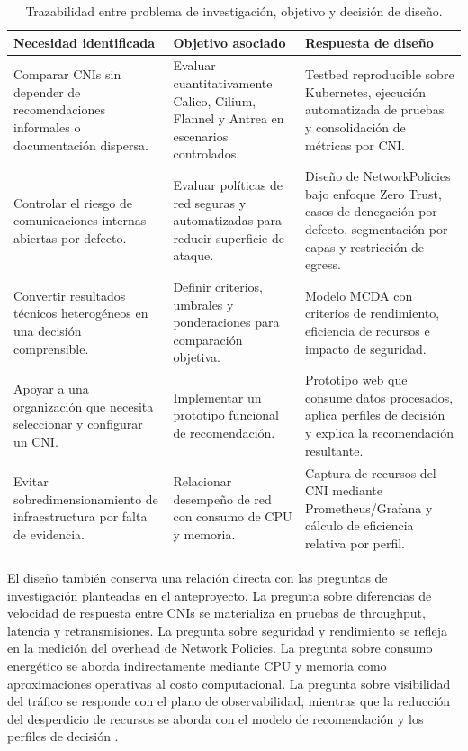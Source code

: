 \begin{table}[htbp]
\centering
\scriptsize
\caption{Trazabilidad entre problema de investigación, objetivo y decisión de diseño.}
\label{tab:trazabilidad-diseno}
\begin{tabularx}{\textwidth}{|Y|Y|Y|}
\hline
\textbf{Necesidad identificada} & \textbf{Objetivo asociado} & \textbf{Respuesta de diseño} \\
\hline
Comparar CNIs sin depender de recomendaciones informales o documentación dispersa. & Evaluar cuantitativamente Calico, Cilium, Flannel y Antrea en escenarios controlados. & Testbed reproducible sobre Kubernetes, ejecución automatizada de pruebas y consolidación de métricas por CNI. \\
\hline
Controlar el riesgo de comunicaciones internas abiertas por defecto. & Evaluar políticas de red seguras y automatizadas para reducir superficie de ataque. & Diseño de NetworkPolicies bajo enfoque Zero Trust, casos de denegación por defecto, segmentación por capas y restricción de egress. \\
\hline
Convertir resultados técnicos heterogéneos en una decisión comprensible. & Definir criterios, umbrales y ponderaciones para comparación objetiva. & Modelo MCDA con criterios de rendimiento, eficiencia de recursos e impacto de seguridad. \\
\hline
Apoyar a una organización que necesita seleccionar y configurar un CNI. & Implementar un prototipo funcional de recomendación. & Prototipo web que consume datos procesados, aplica perfiles de decisión y explica la recomendación resultante. \\
\hline
Evitar sobredimensionamiento de infraestructura por falta de evidencia. & Relacionar desempeño de red con consumo de CPU y memoria. & Captura de recursos del CNI mediante Prometheus/Grafana y cálculo de eficiencia relativa por perfil. \\
\hline
\end{tabularx}
\end{table}

El diseño también conserva una relación directa con las preguntas de investigación planteadas en el anteproyecto. La pregunta sobre diferencias de velocidad de respuesta entre CNIs se materializa en pruebas de throughput, latencia y retransmisiones. La pregunta sobre seguridad y rendimiento se refleja en la medición del overhead de Network Policies. La pregunta sobre consumo energético se aborda indirectamente mediante CPU y memoria como aproximaciones operativas al costo computacional. La pregunta sobre visibilidad del tráfico se responde con el plano de observabilidad, mientras que la reducción del desperdicio de recursos se aborda con el modelo de recomendación y los perfiles de decisión \cite{ref29}.


